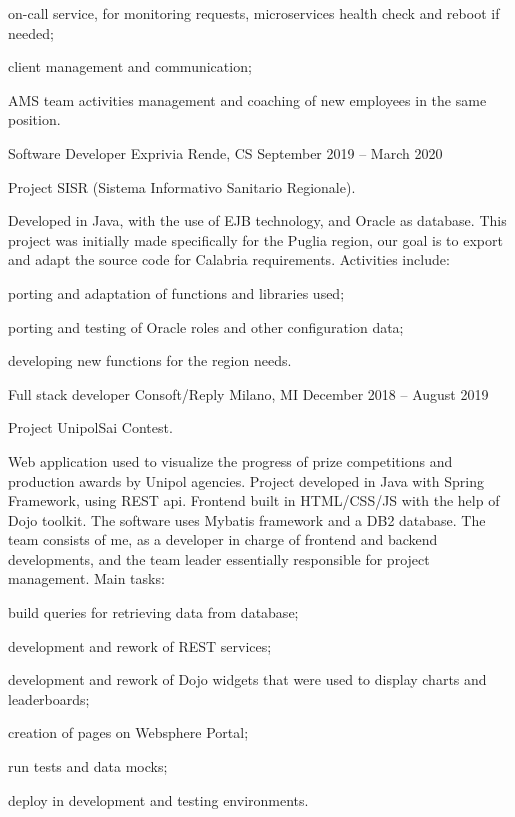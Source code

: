 \documentclass[]{style}
\begin{document}
\begin{cventries}
{\begin{cventryparagraph}
{\begin{cventryparagraphlist}
    		\item {on-call service, for monitoring requests, microservices health check and reboot if needed;}
    		\item {client management and communication;}
    		\item {AMS team activities management and coaching of new employees in the same position.}
    	\end{cventryparagraphlist}}
	\end{cventryparagraph}}
	\cventry
	{Software Developer}
	{Exprivia}
	{Rende, CS}
	{September 2019 – March 2020}
	{\begin{cventryparagraph}
		\item {Project SISR (Sistema Informativo Sanitario Regionale).}
		\item {Developed in Java, with the use of EJB technology, and Oracle as database. This project was initially made specifically for the Puglia region, our goal is to export and adapt the source code for Calabria requirements. Activities include:}
    	{\begin{cventryparagraphlist}
    		\item {porting and adaptation of functions and libraries used;}
    		\item {porting and testing of Oracle roles and other configuration data;}
    		\item {developing new functions for the region needs.}
    	\end{cventryparagraphlist}}
	\end{cventryparagraph}}
	\cventry
	{Full stack developer}
	{Consoft/Reply}
	{Milano, MI}
	{December 2018 – August 2019}
	{\begin{cventryparagraph}
		\item {Project UnipolSai Contest.}
		\item {Web application used to visualize the progress of prize competitions and production awards by Unipol agencies. Project developed in Java with Spring Framework, using REST api. Frontend built in HTML/CSS/JS with the help of Dojo toolkit. The software uses Mybatis framework and a DB2 database.
		The team consists of me, as a developer in charge of frontend and backend developments, and the team leader essentially responsible for project management. Main tasks:}
    	{\begin{cventryparagraphlist}
    		\item {build queries for retrieving data from database;}
    		\item {development and rework of REST services;}
    		\item {development and rework of Dojo widgets that were used to display charts and leaderboards;}
    		\item {creation of pages on Websphere Portal;}
    		\item {run tests and data mocks;}
    		\item {deploy in development and testing environments.}
    	\end{cventryparagraphlist}}
	\end{cventryparagraph}}
\end{cventries}
\pagebreak[4]
\end{document}
